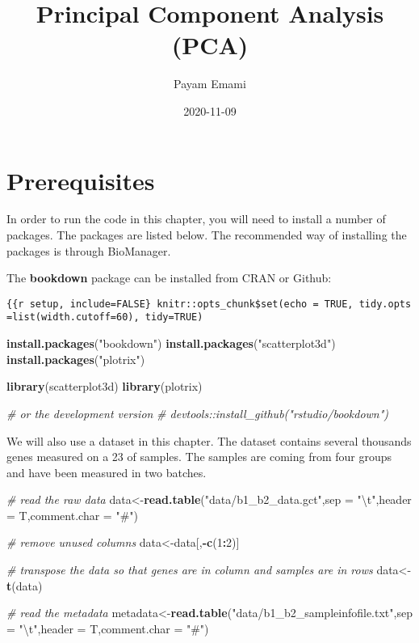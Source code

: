 \documentclass[
]{book}
\title{Principal Component Analysis (PCA)}
\author{Payam Emami}
\date{2020-11-09}
\newenvironment{Shaded}{\begin{snugshade}}{\end{snugshade}}
\newcommand{\CharTok}[1]{\textcolor[rgb]{0.31,0.60,0.02}{#1}}
\newcommand{\CommentTok}[1]{\textcolor[rgb]{0.56,0.35,0.01}{\textit{#1}}}
\newcommand{\DataTypeTok}[1]{\textcolor[rgb]{0.13,0.29,0.53}{#1}}
\newcommand{\DecValTok}[1]{\textcolor[rgb]{0.00,0.00,0.81}{#1}}
\newcommand{\KeywordTok}[1]{\textcolor[rgb]{0.13,0.29,0.53}{\textbf{#1}}}
\newcommand{\NormalTok}[1]{#1}
\newcommand{\OperatorTok}[1]{\textcolor[rgb]{0.81,0.36,0.00}{\textbf{#1}}}
\newcommand{\StringTok}[1]{\textcolor[rgb]{0.31,0.60,0.02}{#1}}
\theoremstyle{definition}
\theoremstyle{definition}
\theoremstyle{definition}
\theoremstyle{remark}
\begin{document}
\maketitle

{
\setcounter{tocdepth}{1}
\tableofcontents
}
\hypertarget{prerequisites}{%
\chapter{Prerequisites}\label{prerequisites}}

In order to run the code in this chapter, you will need to install a number of packages. The packages are listed below. The recommended way of installing the packages is through BioManager.

The \textbf{bookdown} package can be installed from CRAN or Github:

\texttt{\{\{r\ setup,\ include=FALSE\}\ knitr::opts\_chunk\$set(echo\ =\ TRUE,\ tidy.opts=list(width.cutoff=60),\ tidy=TRUE)}

\begin{Shaded}
\begin{Highlighting}[]
\KeywordTok{install.packages}\NormalTok{(}\StringTok{"bookdown"}\NormalTok{)}
\KeywordTok{install.packages}\NormalTok{(}\StringTok{"scatterplot3d"}\NormalTok{)}
\KeywordTok{install.packages}\NormalTok{(}\StringTok{"plotrix"}\NormalTok{)}

\KeywordTok{library}\NormalTok{(scatterplot3d)}
\KeywordTok{library}\NormalTok{(plotrix)}

\CommentTok{# or the development version}
\CommentTok{# devtools::install_github("rstudio/bookdown")}
\end{Highlighting}
\end{Shaded}

We will also use a dataset in this chapter. The dataset contains several thousands genes measured on a 23 of samples. The samples are coming from four groups and have been measured in two batches.

\begin{Shaded}
\begin{Highlighting}[]
\CommentTok{# read the raw data}
\NormalTok{data<-}\KeywordTok{read.table}\NormalTok{(}\StringTok{"data/b1_b2_data.gct"}\NormalTok{,}\DataTypeTok{sep =} \StringTok{"}\CharTok{\textbackslash{}t}\StringTok{"}\NormalTok{,}\DataTypeTok{header =}\NormalTok{ T,}\DataTypeTok{comment.char =} \StringTok{"#"}\NormalTok{)}

\CommentTok{# remove unused columns }
\NormalTok{data<-data[,}\OperatorTok{-}\KeywordTok{c}\NormalTok{(}\DecValTok{1}\OperatorTok{:}\DecValTok{2}\NormalTok{)]}

\CommentTok{# transpose the data so that genes are in column and samples are in rows}
\NormalTok{data<-}\KeywordTok{t}\NormalTok{(data)}

\CommentTok{# read the metadata}
\NormalTok{metadata<-}\KeywordTok{read.table}\NormalTok{(}\StringTok{"data/b1_b2_sampleinfofile.txt"}\NormalTok{,}\DataTypeTok{sep =} \StringTok{"}\CharTok{\textbackslash{}t}\StringTok{"}\NormalTok{,}\DataTypeTok{header =}\NormalTok{ T,}\DataTypeTok{comment.char =} \StringTok{"#"}\NormalTok{)}
\end{Highlighting}
\end{Shaded}
\end{document}
